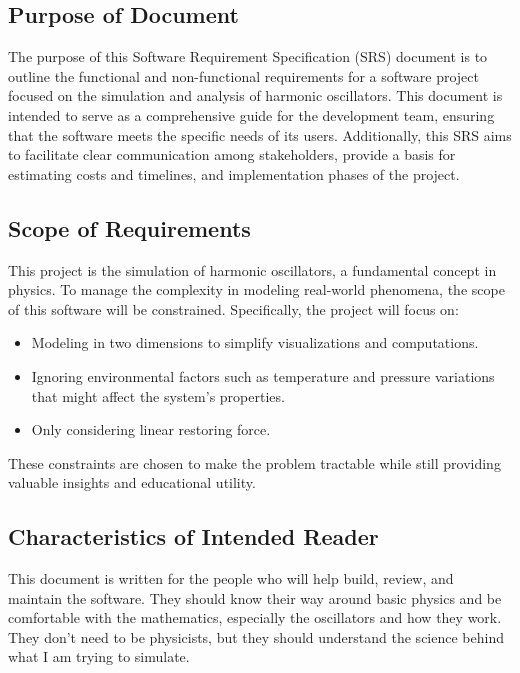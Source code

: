 \documentclass[12pt]{article}
\begin{document}
\subsection{Purpose of Document}

The purpose of this Software Requirement Specification (SRS) document 
is to outline the functional and non-functional requirements for a 
software project focused on the simulation and analysis of harmonic 
oscillators. This document is intended to serve as a comprehensive 
guide for the development team, ensuring that the software meets the 
specific needs of its users. Additionally, this SRS aims to facilitate 
clear communication among stakeholders, provide a basis for estimating 
costs and timelines, and implementation phases of the project.

\subsection{Scope of Requirements} 

This project is the simulation of harmonic oscillators, a fundamental 
concept in physics. To manage the complexity in modeling real-world 
phenomena, the scope of this software will be constrained. Specifically, 
the project will focus on:

\begin{itemize}
  \item Modeling in two dimensions to simplify visualizations and 
  computations.
  \item Ignoring environmental factors such as temperature and pressure 
  variations that might affect the system's properties.
  \item Only considering linear restoring force.
\end{itemize}

These constraints are chosen to make the problem tractable while still 
providing valuable insights and educational utility.

\subsection{Characteristics of Intended Reader} \label{sec_IntendedReader}

This document is written for the people who will help build, review, 
and maintain the software. They should know their way around basic 
physics and be comfortable with the mathematics, especially the 
oscillators and how they work. They don't need to be physicists, but 
they should understand the science behind what I am trying to simulate.
\end{document}
